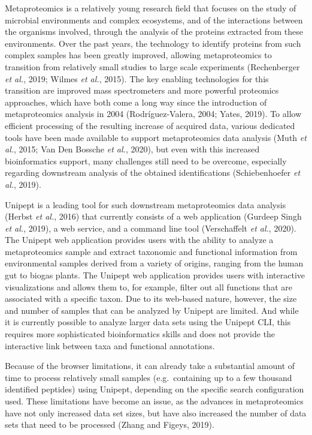 Metaproteomics is a relatively young research field that focuses on the
study of microbial environments and complex ecosystems, and of the
interactions between the organisms involved, through the analysis of the
proteins extracted from these environments. Over the past years, the
technology to identify proteins from such complex samples has been
greatly improved, allowing metaproteomics to transition from relatively
small studies to large scale experiments (Rechenberger \emph{et al.},
2019; Wilmes \emph{et al.}, 2015). The key enabling technologies for
this transition are improved mass spectrometers and more powerful
proteomics approaches, which have both come a long way since the
introduction of metaproteomics analysis in 2004 (Rodríguez-Valera, 2004;
Yates, 2019). To allow efficient processing of the resulting increase of
acquired data, various dedicated tools have been made available to
support metaproteomics data analysis (Muth \emph{et al.}, 2015; Van Den
Bossche \emph{et al.}, 2020), but even with this increased
bioinformatics support, many challenges still need to be overcome,
especially regarding downstream analysis of the obtained identifications
(Schiebenhoefer \emph{et al.}, 2019).

Unipept is a leading tool for such downstream metaproteomics data
analysis (Herbst \emph{et al.}, 2016) that currently consists of a web
application (Gurdeep Singh \emph{et al.}, 2019), a web service, and a
command line tool (Verschaffelt \emph{et al.}, 2020). The Unipept web
application provides users with the ability to analyze a metaproteomics
sample and extract taxonomic and functional information from
environmental samples derived from a variety of origins, ranging from
the human gut to biogas plants. The Unipept web application provides
users with interactive visualizations and allows them to, for example,
filter out all functions that are associated with a specific taxon. Due
to its web-based nature, however, the size and number of samples that
can be analyzed by Unipept are limited. And while it is currently
possible to analyze larger data sets using the Unipept CLI, this
requires more sophisticated bioinformatics skills and does not provide
the interactive link between taxa and functional annotations.

Because of the browser limitations, it can already take a substantial
amount of time to process relatively small samples (e.g.~containing up
to a few thousand identified peptides) using Unipept, depending on the
specific search configuration used. These limitations have become an
issue, as the advances in metaproteomics have not only increased data
set sizes, but have also increased the number of data sets that need to
be processed (Zhang and Figeys, 2019).

